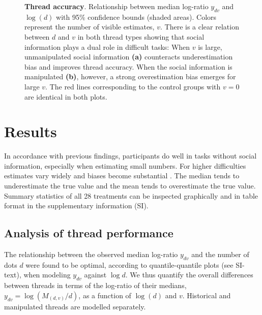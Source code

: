 \documentclass[9pt,a4paper,twocolumn,lineno]{article}
\begin{document}
\begin{figure}[t]
\begin{subfigure}[t]{.46\linewidth}
	\end{subfigure}
	\caption{\textbf{Thread accuracy}. Relationship between median log-ratio $y_{dv}$ and $\log(d)$ with 95\% confidence bounds (shaded areas). Colors represent the number of visible estimates, $v$. There is a clear relation between $d$ and $v$ in both thread types showing that social information plays a dual role in difficult tasks: When $v$ is large, unmanipulated social information \textbf{(a)} counteracts underestimation bias and improves thread accuracy. When the social information is manipulated \textbf{(b)}, however, a strong overestimation bias emerges for large $v$. The red lines corresponding to the control groups with $v=0$ are identical in both plots.}
	\label{fig: median confidence bounds}
\end{figure}


\section*{Results}
In accordance with previous findings, participants do well in tasks without social information, especially when estimating small numbers. For higher difficulties estimates vary widely and biases become substantial \cite{indow1977scaling, izard2008calibrating, krueger1982single, krueger1984perceived, kao2018counteracting}. The median tends to underestimate the true value and the mean tends to overestimate the true value. Summary statistics of all 28 treatments can be inspected graphically and in table format in the supplementary information (SI).

\subsection*{Analysis of thread performance}
The relationship between the observed median log-ratio $y_{dv}$ and the number of dots $d$ were found to be optimal, according to quantile-quantile plots (see SI-text), when modeling $y_{dv}$ against $\log{d}$. We thus quantify the overall differences between threads in terms of the log-ratio of their medians, $y_{dv}=\log(M_{(d,v)}/d)$, as a function of $\log(d)$ and $v$. Historical and manipulated threads are modelled separately.
\end{document}
